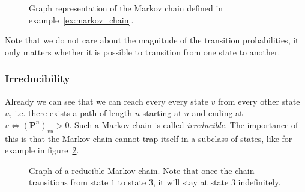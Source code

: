 \documentclass[../../main.tex]{subfiles}
\begin{document}
\begin{figure}[h]
    \center
    \caption{Graph representation of the Markov chain defined in example~\ref{ex:markov_chain}.}
    \label{fig:markov_chain}
\end{figure}

Note that we do not care about the magnitude of the transition probabilities, it only matters whether it is possible to transition from one state to another.

\subsubsection{Irreducibility}
Already we can see that we can reach every every state $v$ from every other state $u$, i.e. there exists a path of length $n$ starting at $u$ and ending at $v \iff (\bm{P}^n)_{vu} > 0$. Such a Markov chain is called \emph{irreducible}. The importance of this is that the Markov chain cannot trap itself in a subclass of states, like for example in figure~\ref{fig:markov_chain_reducible}.

\begin{figure}[h]
    \center
    \caption{Graph of a reducible Markov chain. Note that once the chain transitions from state $1$ to state $3$, it will stay at state $3$ indefinitely.}
    \label{fig:markov_chain_reducible}
\end{figure}
\end{document}

